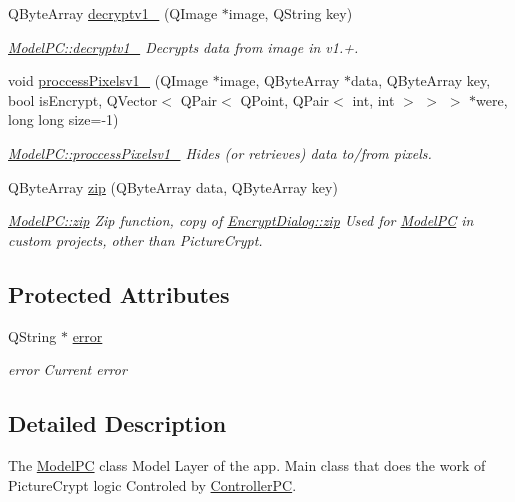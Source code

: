 \begin{DoxyCompactItemize}
Q\-Byte\-Array \hyperlink{class_model_p_c_a7a1f7d491e1bde16936190b9e90896b0}{decryptv1\-\_} (Q\-Image $\ast$image, Q\-String key)
\begin{DoxyCompactList}\small\item\em \hyperlink{class_model_p_c_a7a1f7d491e1bde16936190b9e90896b0}{Model\-P\-C\-::decryptv1\-\_} Decrypts data from image in v1.+. \end{DoxyCompactList}\item 
void \hyperlink{class_model_p_c_a5cdb4d1d61ff62ee9d45b496a7dbf1fb}{proccess\-Pixelsv1\-\_} (Q\-Image $\ast$image, Q\-Byte\-Array $\ast$data, Q\-Byte\-Array key, bool is\-Encrypt, Q\-Vector$<$ Q\-Pair$<$ Q\-Point, Q\-Pair$<$ int, int $>$ $>$ $>$ $\ast$were, long long size=-\/1)
\begin{DoxyCompactList}\small\item\em \hyperlink{class_model_p_c_a5cdb4d1d61ff62ee9d45b496a7dbf1fb}{Model\-P\-C\-::proccess\-Pixelsv1\-\_} Hides (or retrieves) data to/from pixels. \end{DoxyCompactList}\item 
Q\-Byte\-Array \hyperlink{class_model_p_c_afebbbfa4b07deba4f68fc6dfb50f353f}{zip} (Q\-Byte\-Array data, Q\-Byte\-Array key)
\begin{DoxyCompactList}\small\item\em \hyperlink{class_model_p_c_afebbbfa4b07deba4f68fc6dfb50f353f}{Model\-P\-C\-::zip} Zip function, copy of \hyperlink{class_encrypt_dialog_a2bff820a3df4ddc36ecb07ed74b7138a}{Encrypt\-Dialog\-::zip} Used for \hyperlink{class_model_p_c}{Model\-P\-C} in custom projects, other than Picture\-Crypt. \end{DoxyCompactList}\end{DoxyCompactItemize}
\subsection*{Protected Attributes}
\begin{DoxyCompactItemize}
\item 
Q\-String $\ast$ \hyperlink{class_model_p_c_a4e5a9c0ca1f06fe5bc478b6bf248c37c}{error}
\begin{DoxyCompactList}\small\item\em error Current error \end{DoxyCompactList}\end{DoxyCompactItemize}


\subsection{Detailed Description}
The \hyperlink{class_model_p_c}{Model\-P\-C} class Model Layer of the app. Main class that does the work of Picture\-Crypt logic Controled by \hyperlink{class_controller_p_c}{Controller\-P\-C}. 

